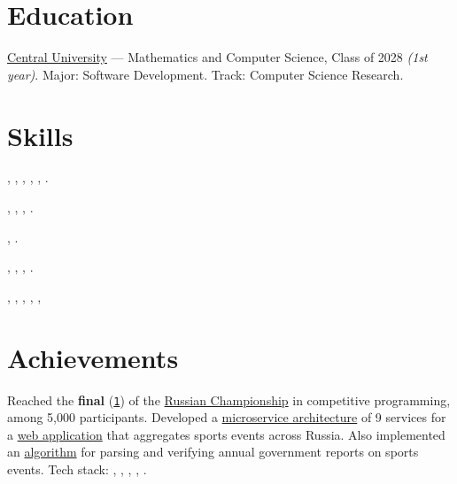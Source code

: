 \documentclass[margin,line]{resume}
\begin{document}
\begin{resume}
  \section{\mysidestyle Education}
  \href{https://centraluniversity.ru/}{Central University} — Mathematics and Computer Science, Class of 2028 \textit{(1st year)}.
  Major: Software Development. Track: Computer Science Research.

  \section{\mysidestyle Skills}

  \vspace{0.4mm}
  \begin{description}[leftmargin=0pt, itemindent=*, itemsep=0.2pt]
    \item[Go:] , ,
      , ,
      , .
    \item[Databases:] , ,
      , .
    \item[Message brokers:] , .
    \item[Other technologies:] , ,
      , .
    \item[Dev tools:] , ,
      , , ,
  \end{description}

  \section{\mysidestyle Achievements}
  Reached the \textbf{final}
  (\href{https://alchemmist.github.io/CV/attachments/russian-chemp-final.pdf}{\texttt{1}})
  of the \href{https://events.fsp-russia.com/championship}{Russian Championship} in competitive programming, among 5,000 participants. Developed a
  \href{https://alchemmist.github.io/CV/attachments/architect.pdf}{microservice
  architecture} of 9 services for a
  \href{https://github.com/alchemmist/sportprog}{web application} that aggregates sports events across Russia. Also implemented an
  \href{https://github.com/alchemmist/sport-afisha/blob/main/event_parsing_service/parse_pdf.py}{algorithm}
  for parsing and verifying annual government reports on sports events.
  Tech stack: , ,
  ,
  ,
  .


\end{resume}
\end{document}
